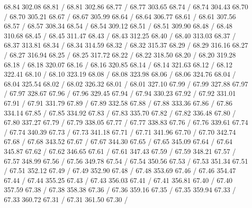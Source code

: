 { 68.84 302.08 68.81 /
 68.81 302.86 68.77 /
 68.77 303.65 68.74 /
 68.74 304.43 68.70 /
 68.70 305.21 68.67 /
 68.67 305.99 68.64 /
 68.64 306.77 68.61 /
 68.61 307.56 68.57 /
 68.57 308.34 68.54 /
 68.54 309.12 68.51 /
 68.51 309.90 68.48 /
 68.48 310.68 68.45 /
 68.45 311.47 68.43 /
 68.43 312.25 68.40 /
 68.40 313.03 68.37 /
 68.37 313.81 68.34 /
 68.34 314.59 68.32 /
 68.32 315.37 68.29 /
 68.29 316.16 68.27 /
 68.27 316.94 68.25 /
 68.25 317.72 68.22 /
 68.22 318.50 68.20 /
 68.20 319.28 68.18 /
 68.18 320.07 68.16 /
 68.16 320.85 68.14 /
 68.14 321.63 68.12 /
 68.12 322.41 68.10 /
 68.10 323.19 68.08 /
 68.08 323.98 68.06 /
 68.06 324.76 68.04 /
 68.04 325.54 68.02 /
 68.02 326.32 68.01 /
 68.01 327.10 67.99 /
 67.99 327.88 67.97 /
 67.97 328.67 67.96 /
 67.96 329.45 67.94 /
 67.94 330.23 67.92 /
 67.92 331.01 67.91 /
 67.91 331.79 67.89 /
 67.89 332.58 67.88 /
 67.88 333.36 67.86 /
 67.86 334.14 67.85 /
 67.85 334.92 67.83 /
 67.83 335.70 67.82 /
 67.82 336.48 67.80 /
 67.80 337.27 67.79 /
 67.79 338.05 67.77 /
 67.77 338.83 67.76 /
 67.76 339.61 67.74 /
 67.74 340.39 67.73 /
 67.73 341.18 67.71 /
 67.71 341.96 67.70 /
 67.70 342.74 67.68 /
 67.68 343.52 67.67 /
 67.67 344.30 67.65 /
 67.65 345.09 67.64 /
 67.64 345.87 67.62 /
 67.62 346.65 67.61 /
 67.61 347.43 67.59 /
 67.59 348.21 67.57 /
 67.57 348.99 67.56 /
 67.56 349.78 67.54 /
 67.54 350.56 67.53 /
 67.53 351.34 67.51 /
 67.51 352.12 67.49 /
 67.49 352.90 67.48 /
 67.48 353.69 67.46 /
 67.46 354.47 67.44 /
 67.44 355.25 67.43 /
 67.43 356.03 67.41 /
 67.41 356.81 67.40 /
 67.40 357.59 67.38 /
 67.38 358.38 67.36 /
 67.36 359.16 67.35 /
 67.35 359.94 67.33 /
 67.33 360.72 67.31 /
 67.31 361.50 67.30 /
}

